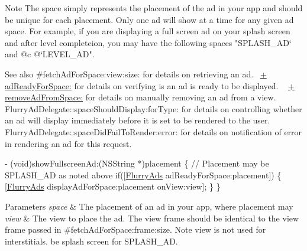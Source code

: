 \begin{DoxyNote}{Note}
The {\ttfamily space} simply represents the placement of the ad in your app and should be unique for each placement. Only one ad will show at a time for any given ad space. For example, if you are displaying a full screen ad on your splash screen and after level completeion, you may have the following spaces {\ttfamily "S\+P\+L\+A\+S\+H\+\_\+\+AD\char`\"{} and @c @\char`\"{}L\+E\+V\+E\+L\+\_\+\+AD"}.
\end{DoxyNote}
\begin{DoxySeeAlso}{See also}
\#fetch\+Ad\+For\+Space\+:view\+:size\+: for details on retrieving an ad.~\newline
 \hyperlink{interfaceFlurryAds_a1f87cd568f71e77a9c89264b165d2164}{+ ad\+Ready\+For\+Space\+:} for details on verifying is an ad is ready to be displayed. ~\newline
 \hyperlink{interfaceFlurryAds_aaf30e23048de55a1adb8a2c067428be6}{+ remove\+Ad\+From\+Space\+:} for details on manually removing an ad from a view. ~\newline
 Flurry\+Ad\+Delegate\+::space\+Should\+Display\+:for\+Type\+: for details on controlling whether an ad will display immediately before it is set to be rendered to the user. Flurry\+Ad\+Delegate\+::space\+Did\+Fail\+To\+Render\+:error\+: for details on notification of error in rendering an ad for this request.
\end{DoxySeeAlso}

\begin{DoxyCode}
   - (void)showFullscreenAd:(NSString *)placement 
\{
\textcolor{comment}{// Placement may be SPLASH\_AD as noted above}
\textcolor{keywordflow}{if}([\hyperlink{interfaceFlurryAds}{FlurryAds} adReadyForSpace:placement])
\{
   [\hyperlink{interfaceFlurryAds}{FlurryAds} displayAdForSpace:placement onView:view];
\}
\}
\end{DoxyCode}



\begin{DoxyParams}{Parameters}
{\em space} & The placement of an ad in your app, where placement may \\
\hline
{\em view} & The view to place the ad. The view frame should be identical to the view frame passed in \#fetch\+Ad\+For\+Space\+:frame\+:size. Note view is not used for interstitials. be splash screen for S\+P\+L\+A\+S\+H\+\_\+\+AD. \\
\hline
\end{DoxyParams}
\mbox{\label{interfaceFlurryAds_ab7060d936494e1ab82566c5592385837}} 
